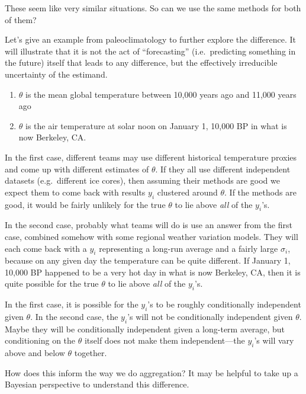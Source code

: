 \documentclass[12pt]{article}
\begin{document}
These seem like very similar situations. So can we use the same methods for both of them?

Let's give an example from paleoclimatology to further explore the difference. It will illustrate that it is not the act of ``forecasting'' (i.e.~predicting something in the future) itself that leads to any difference, but the effectively irreducible uncertainty of the estimand.

\begin{enumerate}
\item
  $\theta$ is the mean global temperature between 10,000 years ago and 11,000 years ago
\item
  $\theta$ is the air temperature at solar noon on January 1, 10,000 BP in what is now Berkeley, CA.
\end{enumerate}

In the first case, different teams may use different historical temperature proxies and come up with different estimates of $\theta$. If they all use different independent datasets (e.g.~different ice cores), then assuming their methods are good we expect them to come back with results $y_i$ clustered around $\theta$. If the methods are good, it would be fairly unlikely for the true $\theta$ to lie above \emph{all} of the $y_i$'s.

In the second case, probably what teams will do is use an answer from the first case, combined somehow with some regional weather variation models. They will each come back with a $y_i$ representing a long-run average and a fairly large $\sigma_i$, because on any given day the temperature can be quite different. If January 1, 10,000 BP happened to be a very hot day in what is now Berkeley, CA, then it is quite possible for the true $\theta$ to lie above \emph{all} of the $y_i$'s.

In the first case, it is possible for the $y_i$'s to be roughly conditionally independent given $\theta$. In the second case, the $y_i$'s will not be conditionally independent given $\theta$. Maybe they will be conditionally independent given a long-term average, but conditioning on the $\theta$ itself does not make them independent---the $y_i$'s will vary above and below $\theta$ together.

How does this inform the way we do aggregation? It may be helpful to take up a Bayesian perspective to understand this difference.
\end{document}
